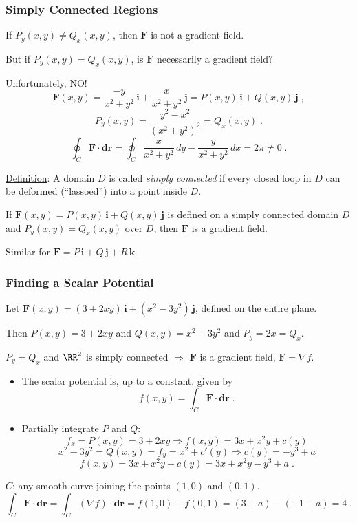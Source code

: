 \begin{frame}
  \frametitle{Simply Connected Regions}

  If $P_y(x,y) \neq Q_x(x,y)$, then \pause $\textbf{F}$ is not a gradient field.

  \pause But if $P_y(x,y) = Q_x(x,y)$, is $\textbf{F}$ necessarily a gradient field?

  \pause Unfortunately, NO!
%
$$\textbf{F}(x,y) = \frac{-y}{x^2+y^2} \, \textbf{i} + \frac{x}{x^2+y^2} \, \textbf{j} = P(x,y) \, \textbf{i} + Q(x,y)\, \textbf{j}\; ,$$
%
$$P_y(x,y) = \frac{y^2-x^2}{(x^2+y^2)^2} = Q_x(x,y) \; .$$
%
$$\oint_C \textbf{F} \cdot \textbf{dr} = \oint_C \frac{x}{x^2+y^2} \, dy - \frac{y}{x^2+y^2}\, dx = 2\pi \neq 0 \; .$$

\pause \underline{Definition}: A domain $D$ is called \emph{simply connected} if every closed loop in $D$ can be deformed (``lassoed'') into a point inside $D$.

\medskip

If $\textbf{F}(x,y)=P(x,y) \, \textbf{i} + Q(x,y) \, \textbf{j}$ is defined on a simply connected domain $D$ and $P_y(x,y)=Q_x(x,y)$ over $D$, then $\textbf{F}$ is a gradient field.

Similar for $\textbf{F} = P \, \textbf{i} + Q\, \textbf{j} + R\, \textbf{k}$
\end{frame}

\begin{frame}
  \frametitle{Finding a Scalar Potential}

  Let $\textbf{F}(x,y) = (3+2xy) \, \textbf{i} + (x^2-3y^2)\, \textbf{j}$, defined on the entire plane. \pause

  Then $P(x,y) = 3+2xy$ and $Q(x,y) = x^2-3y^2$ and $P_y = 2x=Q_x$.

  \pause $P_y=Q_x$ and $\RR^2$ is simply connected $\Longrightarrow$ $\textbf{F}$ is a gradient field, $\textbf{F} = \nabla f$.

  \begin{itemize}
    \item \pause The scalar potential is, up to a constant, given by
%
$$f(x,y) = \int_C \textbf{F} \cdot \textbf{dr} \; .$$
%
    \item \pause Partially integrate $P$ and $Q$:
    $$f_x = P(x,y) = 3+2xy \Longrightarrow f(x,y) = 3x+x^2y + c(y)$$
    \pause
    $$x^2-3y^2  = Q(x,y) = f_y = x^2+c'(y) \Longrightarrow c(y) = -y^3+a$$
    \pause
    $$f(x,y) = 3x+x^2y + c(y) = 3x+x^2y-y^3+a\; .$$
  \end{itemize}

\pause $C$: any smooth curve joining the points $(1,0)$ and $(0,1)$.
%
$$\int_C \textbf{F} \cdot \textbf{dr} = \int_C (\nabla f) \cdot \textbf{dr} = f(1,0) - f(0,1) = (3+a) - (-1+a) = 4\; .$$

\end{frame}


